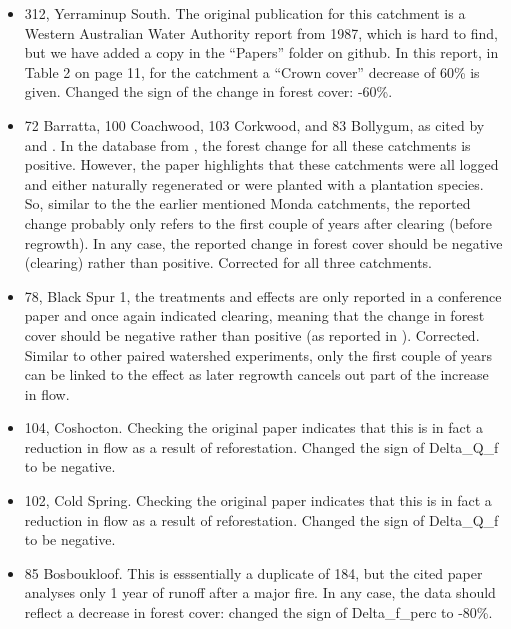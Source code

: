 \documentclass[]{elsarticle} %
\begin{document}
\begin{itemize}
\item
  312, Yerraminup South. The original publication for this catchment is a Western Australian Water Authority report from 1987, which is hard to find, but we have added a copy in the ``Papers'' folder on github. In this report, in Table 2 on page 11, for the catchment a ``Crown cover'' decrease of 60\% is given. Changed the sign of the change in forest cover: -60\%.\\
\item
  72 Barratta, 100 Coachwood, 103 Corkwood, and 83 Bollygum, as cited by \citet{cornish1993} and \citet{cornish2001}. In the database from \citet{zhang2017}, the forest change for all these catchments is positive. However, the paper highlights that these catchments were all logged and either naturally regenerated or were planted with a plantation species. So, similar to the the earlier mentioned Monda catchments, the reported change probably only refers to the first couple of years after clearing (before regrowth). In any case, the reported change in forest cover should be negative (clearing) rather than positive. Corrected for all three catchments.\\
\item
  78, Black Spur 1, the treatments and effects are only reported in a conference paper \citep{jayasuriya1988} and once again indicated clearing, meaning that the change in forest cover should be negative rather than positive (as reported in \citet{zhang2017}). Corrected. Similar to other paired watershed experiments, only the first couple of years can be linked to the effect as later regrowth cancels out part of the increase in flow.\\
\item
  104, Coshocton. Checking the original paper indicates that this is in fact a reduction in flow as a result of reforestation. Changed the sign of Delta\_Q\_f to be negative.\\
\item
  102, Cold Spring. Checking the original paper \citep{schneider1961} indicates that this is in fact a reduction in flow as a result of reforestation. Changed the sign of Delta\_Q\_f to be negative.\\
\item
  85 Bosboukloof. This is esssentially a duplicate of 184, but the cited paper analyses only 1 year of runoff after a major fire. In any case, the data should reflect a decrease in forest cover: changed the sign of Delta\_f\_perc to -80\%.\\

\end{itemize}
\end{document}
